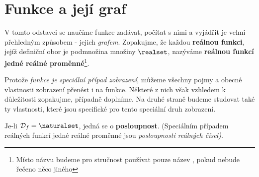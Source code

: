   \section{Funkce a její graf}\label{mai:IchapIIIsecI}
    V tomto odstavci se naučíme funkce zadávat, počítat s nimi a vyjádřit je velmi přehledným 
    způsobem - jejich \emph{grafem}. Zopakujme, že každou \textbf{reálnou funkci}, jejíž 
    definiční obor je podmnožina množiny \(\realset\), nazýváme \textbf{reálnou funkcí jedné 
    reálné proměnné}\footnote{Místo názvu  budeme pro 
    stručnost používat pouze název , pokud nebude řečeno něco jiného}.
    
    Protože \emph{funkce je speciální případ zobrazení}, můžeme všech\-ny pojmy a obecné 
    vlastnosti zobrazení přenést i na funkce. Některé z nich však vzhledem k důležitosti 
    zopakujme, případně doplníme. Na druhé straně budeme studovat také ty vlastnosti, které jsou 
    specifické pro tento speciální druh zobrazení.
    
    \begin{tcnote}
      Je-li \(\mathcal{D}_f = \naturalset\), jedná se o \textbf{posloupnost}. (Speciálním 
      případem reálných funkcí jedné reálné proměnné jsou \emph{posloupnosti reálných čísel)}.
    \end{tcnote}
      
